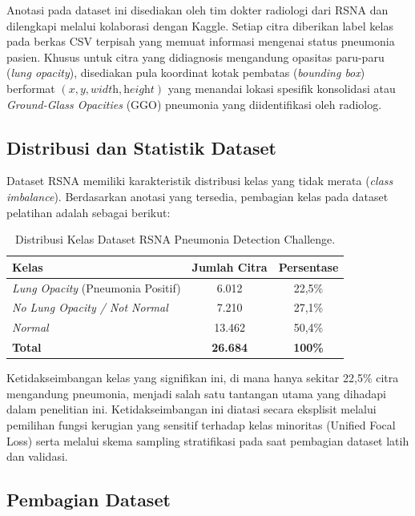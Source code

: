 \documentclass[12pt,a4paper,oneside]{book}
\begin{document}
Anotasi pada dataset ini disediakan oleh tim dokter radiologi dari RSNA dan dilengkapi melalui kolaborasi dengan Kaggle. Setiap citra diberikan label kelas pada berkas CSV terpisah yang memuat informasi mengenai status pneumonia pasien. Khusus untuk citra yang didiagnosis mengandung opasitas paru-paru (\textit{lung opacity}), disediakan pula koordinat kotak pembatas (\textit{bounding box}) berformat $(x, y, \textit{width}, \textit{height})$ yang menandai lokasi spesifik konsolidasi atau \textit{Ground-Glass Opacities} (GGO) pneumonia yang diidentifikasi oleh radiolog.

\subsection{Distribusi dan Statistik Dataset}

Dataset RSNA memiliki karakteristik distribusi kelas yang tidak merata (\textit{class imbalance}). Berdasarkan anotasi yang tersedia, pembagian kelas pada dataset pelatihan adalah sebagai berikut:

\begin{table}[H]
  \centering
  \caption{Distribusi Kelas Dataset RSNA Pneumonia Detection Challenge.}
  \label{tab:distribusi_dataset}
  \begin{tabular}{l c c}
    \toprule
    \textbf{Kelas} & \textbf{Jumlah Citra} & \textbf{Persentase} \\
    \midrule
    \textit{Lung Opacity} (Pneumonia Positif) & 6.012  & 22,5\% \\
    \textit{No Lung Opacity / Not Normal}     & 7.210  & 27,1\% \\
    \textit{Normal}                            & 13.462 & 50,4\% \\
    \midrule
    \textbf{Total}                             & \textbf{26.684} & \textbf{100\%} \\
    \bottomrule
  \end{tabular}
\end{table}

Ketidakseimbangan kelas yang signifikan ini, di mana hanya sekitar 22,5\% citra mengandung pneumonia, menjadi salah satu tantangan utama yang dihadapi dalam penelitian ini. Ketidakseimbangan ini diatasi secara eksplisit melalui pemilihan fungsi kerugian yang sensitif terhadap kelas minoritas (Unified Focal Loss) serta melalui skema sampling stratifikasi pada saat pembagian dataset latih dan validasi.

\subsection{Pembagian Dataset}
\end{document}
